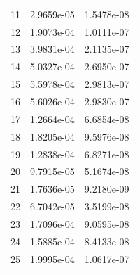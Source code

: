 \documentclass[t, pdftex]{beamer}
\begin{document}
\begin{frame}
\begin{columns}
\begin{column}{0.5\textwidth}
\begin{table}[h]
\begin{center}
\begin{tabular}[h]{|c|C|C|}
                    11 & 2.9659e-05 &  1.5478e-08  \\
                    12 & 1.9073e-04 &  1.0111e-07  \\
                    13 & 3.9831e-04 &  2.1135e-07  \\
                    14 & 5.0327e-04 &  2.6950e-07  \\
                    15 & 5.5978e-04 &  2.9813e-07  \\
                    16 & 5.6026e-04 &  2.9830e-07  \\
                    17 & 1.2664e-04 &  6.6854e-08  \\
                    18 & 1.8205e-04 &  9.5976e-08  \\
                    19 & 1.2838e-04 &  6.8271e-08  \\
                    20 & 9.7915e-05 &  5.1674e-08  \\
                    21 & 1.7636e-05 &  9.2180e-09  \\
                    22 & 6.7042e-05 &  3.5199e-08  \\
                    23 & 1.7096e-04 &  9.0595e-08  \\
                    24 & 1.5885e-04 &  8.4133e-08  \\
                    25 & 1.9995e-04 &  1.0617e-07  \\
                    \hline
                \end{tabular}
                \label{tab:loo_rms}
            \end{center}
        \end{table}
    \end{column}
\end{columns}
\end{frame}
\end{document}
